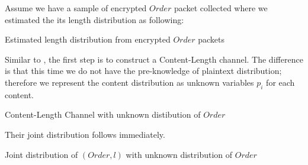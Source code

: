 \begin{example}
Assume we have a sample of encrypted $Order$ packet collected where we estimated the its length distribution as following: 
\begin{table}[H]
\begin{center}
{}
\end{center}
\caption{Estimated length distribution from encrypted $Order$ packets}
\label{Tbl: Estimated length distribution from encrypted $Order$ packets}
\end{table}

Similar to , the first step is to construct a Content-Length channel. The difference is that this time we do not have the pre-knowledge of plaintext distribution; therefore we represent the content distribution as unknown variables $p_i$ for each content.

\begin{table}[H]
\begin{center}
{}
\end{center}
\caption{Content-Length Channel with unknown distibution of $Order$}
\label{Tbl: Content-Length Channel with unknown distibution of $Order$}
\end{table}


%

Their joint distribution follows immediately.

\begin{table}[H]
\begin{center}
{}
\end{center}
\caption{Joint distribution of $(Order, l)$ with unknown distribution of $Order$}
\label{Tbl: Joint distribution of $(Order, l)$ with unknown distribution of $Order$}
\end{table}


\end{example}
